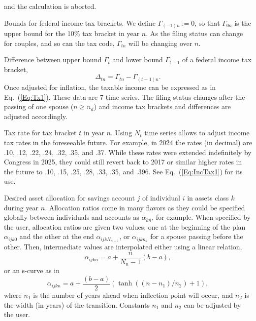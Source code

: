 \documentclass{report}[fleqn,11pt]
\begin{document}
\begin{description}[leftmargin=4em,style=multiline]
        and the calculation is aborted.
\item [$\Gamma_{tn}$]
	Bounds for federal income tax brackets. We define $\Gamma_{(-1)n} := 0$, so that
	$\Gamma_{0n}$ is the upper bound for the 10\% tax bracket in year $n$. As the filing status
	can change for couples, and so can the tax code, $\Gamma_{tn}$ will be changing over $n$.
\item [$\Delta_{tn}$]
	Difference between upper bound $\Gamma_t$ and lower bound $\Gamma_{t-1}$
	of a federal income tax bracket,
	\begin{equation}
		\Delta_{tn} = \Gamma_{tn} - \Gamma_{(t-1)n}.
	\end{equation}
	Once adjusted for inflation,
	the taxable income can be expressed as in Eq.~(\ref{Eq:Tx1}). These data are 7 time series.
	The filing status changes after the passing of one spouse ($n \ge n_d$) and income tax
	brackets and differences are adjusted accordingly.
\item [$\theta_{tn}$]
	Tax rate for tax bracket $t$ in year $n$. Using $N_t$ time series allows to adjust income
	tax rates in the foreseeable future.
	For example, in 2024 the rates (in decimal) are .10, .12, .22, .24, .32, .35, and .37.
        While these rates were extended indefinitely by Congress in 2025, they could still
	revert back to 2017 or similar higher rates in the future to
	.10, .15, .25, .28, .33, .35, and .396. See Eq.~(\ref{Eq:IncTax1}) for its use.
\item [$\alpha_{ijkn}$]
	Desired asset allocation for savings account $j$ of individual $i$ in
	assets class $k$ during year $n$.
	Allocation ratios come in many flavors as they could be specified globally between
	individuals and accounts as $\alpha_{kn}$, for example.
	When specified by the user, allocation ratios are given two values, one at the
	beginning of the plan $\alpha_{ijk0}$ and the other at the end
	$\alpha_{ijkN_{n-1}}$, or $\alpha_{ijkn_d}$ for a spouse passing before the other.
        Then, intermediate values are interpolated either using
	a linear relation,
\begin{equation}
	\alpha_{ijkn} = a + \frac{n}{N_n - 1} (b - a),
\end{equation}
or an s-curve as in
\begin{equation}
	\alpha_{ijkn} = a + \frac{(b - a)}{2}
	(\tanh((n-n_1)/n_2) + 1),
\end{equation}
	where $n_1$ is the number of years ahead when inflection point will occur, and $n_2$ is the
	width (in years) of the transition. Constants $n_1$ and $n_2$ can be adjusted by the user.

\end{description}
\end{document}

